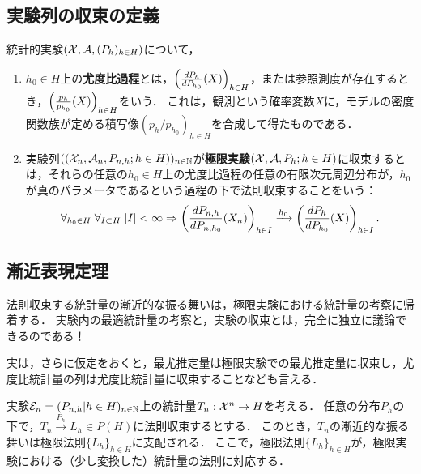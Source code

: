\documentclass[uplatex,dvipdfmx]{jsreport}
\begin{document}
\subsection{実験列の収束の定義}

\begin{definition}
    統計的実験$(\mathcal{X},\mathcal{A},(P_h)_{h\in H})$について，
    \begin{enumerate}
    \item $h_0\in H$上の\textbf{尤度比過程}とは，$\left(\frac{dP_{h}}{dP_{h_0}}(X)\right)_{h\in H}$，または参照測度が存在するとき，$\left(\frac{p_h}{p_{h_0}}(X)\right)_{h\in H}$をいう．
    これは，観測という確率変数$X$に，モデルの密度関数族が定める積写像$(p_h/p_{h_0})_{h\in H}$を合成して得たものである．
    \item 実験列$((\mathcal{X}_n,\mathcal{A}_n,P_{n,h};h\in H))_{n\in\mathbb{N}}$が\textbf{極限実験}$(\mathcal{X},\mathcal{A},P_h;h\in H)$に収束するとは，それらの任意の$h_0\in H$上の尤度比過程の任意の有限次元周辺分布が，$h_0$が真のパラメータであるという過程の下で法則収束することをいう：
    \[\forall_{h_0\in H}\;\forall_{I\subset H}\;\lvert I\rvert<\infty\Rightarrow\left(\frac{dP_{n,h}}{dP_{n,h_0}}(X_n)\right)_{h\in I}\xrightarrow{h_0}\left(\frac{dP_h}{dP_{h_0}}(X)\right)_{h\in I}.\]
    \end{enumerate}
\end{definition}

\subsection{漸近表現定理}

\begin{tcolorbox}[colframe=ForestGreen, colback=ForestGreen!10!white,breakable,colbacktitle=ForestGreen!40!white,coltitle=black,fonttitle=\bfseries\sffamily,
title=]
    法則収束する統計量の漸近的な振る舞いは，極限実験における統計量の考察に帰着する．
    実験内の最適統計量の考察と，実験の収束とは，完全に独立に議論できるのである！

    実は，さらに仮定をおくと，最尤推定量は極限実験での最尤推定量に収束し，尤度比統計量の列は尤度比統計量に収束することなども言える．
\end{tcolorbox}

\begin{notation}
    実験$\mathcal{E}_n=(P_{n,h}|h\in H)_{n\in\mathbb{N}}$上の統計量$T_n:\mathcal{X}^n\to H$を考える．
    任意の分布$P_h$の下で，$T_n\xrightarrow{P_h} L_h\in P(H)$に法則収束するとする．
    このとき，$T_n$の漸近的な振る舞いは極限法則$\{L_h\}_{h\in H}$に支配される．
    ここで，極限法則$\{L_h\}_{h\in H}$が，極限実験における（少し変換した）統計量の法則に対応する．
\end{notation}
\end{document}
